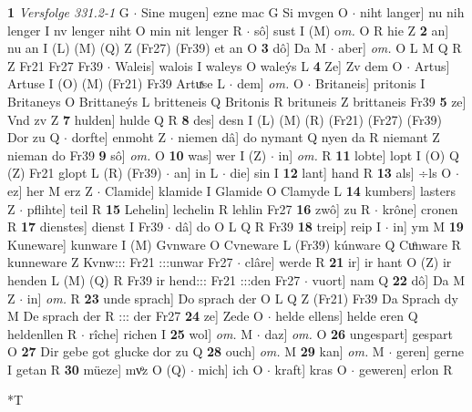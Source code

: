 \documentclass[8pt,a4paper,notitlepage]{article}
\begin{document}
\begin{table}[ht]
\begin{minipage}[t]{0.5\linewidth}
\textbf{1} \textit{Versfolge 331.2-1} G   $\cdot$ Sine mugen] ezne mac G Si mvgen O  $\cdot$ niht langer] nu nih lenger I nv lenger niht O min nit lenger R  $\cdot$ sô] sust I (M) o\textit{m. } O R hie Z \textbf{2} an] nu an I (L) (M) (Q) Z (Fr27) (Fr39) et an O \textbf{3} dô] Da M  $\cdot$ aber] \textit{om.} O L M Q R Z Fr21 Fr27 Fr39  $\cdot$ Waleis] walois I waleys O waleýs L \textbf{4} Ze] Zv dem O  $\cdot$ Artus] Artuse I (O) (M) (Fr21) Fr39 Artuͯse L  $\cdot$ dem] \textit{om.} O  $\cdot$ Britaneis] pritonis I Britaneys O Brittaneýs L britteneis Q Britonis R brituneis Z brittaneis Fr39 \textbf{5} ze] Vnd zv Z \textbf{7} hulden] hulde Q R \textbf{8} des] desn I (L) (M) (R) (Fr21) (Fr27) (Fr39) Dor zu Q  $\cdot$ dorfte] enmoht Z  $\cdot$ niemen dâ] do nymant Q nyen da R niemant Z nieman do Fr39 \textbf{9} sô] \textit{om.} O \textbf{10} was] wer I (Z)  $\cdot$ in] \textit{om.} R \textbf{11} lobte] lopt I (O) Q (Z) Fr21 glopt L (R) (Fr39)  $\cdot$ an] in L  $\cdot$ die] sin I \textbf{12} lant] hand R \textbf{13} als] ÷ls O  $\cdot$ ez] her M erz Z  $\cdot$ Clamide] klamide I Glamide O Clamyde L \textbf{14} kumbers] lasters Z  $\cdot$ pflihte] teil R \textbf{15} Lehelin] lechelin R lehlin Fr27 \textbf{16} zwô] zu R  $\cdot$ krône] cronen R \textbf{17} dienstes] dienst I Fr39  $\cdot$ dâ] do O L Q R Fr39 \textbf{18} treip] reip I  $\cdot$ in] ym M \textbf{19} Kuneware] kunware I (M) Gvnware O Cvneware L (Fr39) kúnware Q Cuͦnware R kunneware Z Kvnw::: Fr21 :::unwar Fr27  $\cdot$ clâre] werde R \textbf{21} ir] ir hant O (Z) ir henden L (M) (Q) R Fr39 ir hend::: Fr21 :::den Fr27  $\cdot$ vuort] nam Q \textbf{22} dô] Da M Z  $\cdot$ in] \textit{om.} R \textbf{23} unde sprach] Do sprach der O L Q Z (Fr21) Fr39 Da Sprach dy M De sprach der R ::: der Fr27 \textbf{24} ze] Zede O  $\cdot$ helde ellens] helde eren Q heldenllen R  $\cdot$ rîche] richen I \textbf{25} wol] \textit{om.} M  $\cdot$ daz] \textit{om.} O \textbf{26} ungespart] gespart O \textbf{27} Dir gebe got glucke dor zu Q \textbf{28} ouch] \textit{om.} M \textbf{29} kan] \textit{om.} M  $\cdot$ geren] gerne I getan R \textbf{30} müeze] mvͦz O (Q)  $\cdot$ mich] ich O  $\cdot$ kraft] kras O  $\cdot$ geweren] erlon R \newline
\end{minipage}
\hspace{0.5cm}
\begin{minipage}[t]{0.5\linewidth}
\small
\begin{center}*T
\end{center}
\begin{tabular}{rl}

\end{tabular}
\end{minipage}
\end{table}
\end{document}
